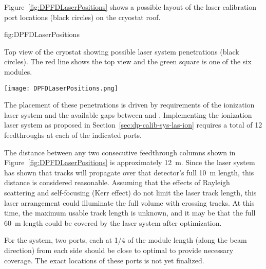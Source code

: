 
Figure~\ref{fig:DPFDLaserPositions} shows a possible layout of the laser calibration port locations (black circles) on the cryostat roof. 

\begin{dunefigure}{fig:DPFDLaserPositions}
{Top view of the \dpmod %
cryostat showing possible laser system penetrations (black circles). The red line shows the  top view and the green square is one of the six  modules. 

}
\texttt{[image: DPFDLaserPositions.png]}
\end{dunefigure}

The placement of these penetrations is driven by requirements of the ionization laser system and the available gaps between  and . 
Implementing the ionization laser system as proposed in Section~\ref{sec:dp-calib-sys-las-ion} requires a total of \num{12} feedthroughs at each of the indicated ports. 

The distance between any two consecutive feedthrough columns shown in Figure~\ref{fig:DPFDLaserPositions} is approximately \SI{12}{\m}. Since the  laser system has shown that tracks will propagate over that detector's full \SI{10}{\m} length, this distance is considered reasonable. Assuming that the effects of Rayleigh scattering and self-focusing (Kerr effect) do not limit the laser track length, this laser arrangement could illuminate the full volume with crossing tracks.
At this time, the maximum usable track length is unknown, and it may be that the full \SI{60}{\m} \detmodule length could be covered by the laser system after optimization.

For the  system, two ports, each at 1/4 of the module length (along the beam direction) from each side should be close to optimal to provide necessary coverage. The exact locations of these ports is not yet finalized.
